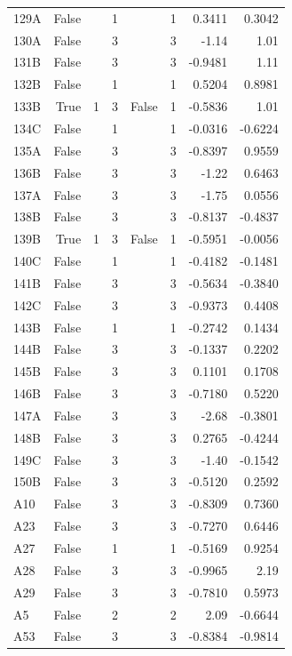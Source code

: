 {\begin{longtable}{lrrrrrrr}
  129A & False &  & 1 &  & 1 & 0.3411 & 0.3042 \\
  130A & False &  & 3 &  & 3 & -1.14 & 1.01 \\
  131B & False &  & 3 &  & 3 & -0.9481 & 1.11 \\
  132B & False &  & 1 &  & 1 & 0.5204 & 0.8981 \\
  133B & True & 1 & 3 & False & 1 & -0.5836 & 1.01 \\
  134C & False &  & 1 &  & 1 & -0.0316 & -0.6224 \\
  135A & False &  & 3 &  & 3 & -0.8397 & 0.9559 \\
  136B & False &  & 3 &  & 3 & -1.22 & 0.6463 \\
  137A & False &  & 3 &  & 3 & -1.75 & 0.0556 \\
  138B & False &  & 3 &  & 3 & -0.8137 & -0.4837 \\
  139B & True & 1 & 3 & False & 1 & -0.5951 & -0.0056 \\
  140C & False &  & 1 &  & 1 & -0.4182 & -0.1481 \\
  141B & False &  & 3 &  & 3 & -0.5634 & -0.3840 \\
  142C & False &  & 3 &  & 3 & -0.9373 & 0.4408 \\
  143B & False &  & 1 &  & 1 & -0.2742 & 0.1434 \\
  144B & False &  & 3 &  & 3 & -0.1337 & 0.2202 \\
  145B & False &  & 3 &  & 3 & 0.1101 & 0.1708 \\
  146B & False &  & 3 &  & 3 & -0.7180 & 0.5220 \\
  147A & False &  & 3 &  & 3 & -2.68 & -0.3801 \\
  148B & False &  & 3 &  & 3 & 0.2765 & -0.4244 \\
  149C & False &  & 3 &  & 3 & -1.40 & -0.1542 \\
  150B & False &  & 3 &  & 3 & -0.5120 & 0.2592 \\
  A10 & False &  & 3 &  & 3 & -0.8309 & 0.7360 \\
  A23 & False &  & 3 &  & 3 & -0.7270 & 0.6446 \\
  A27 & False &  & 1 &  & 1 & -0.5169 & 0.9254 \\
  A28 & False &  & 3 &  & 3 & -0.9965 & 2.19 \\
  A29 & False &  & 3 &  & 3 & -0.7810 & 0.5973 \\
  A5 & False &  & 2 &  & 2 & 2.09 & -0.6644 \\
  A53 & False &  & 3 &  & 3 & -0.8384 & -0.9814 \\

\end{longtable}}
